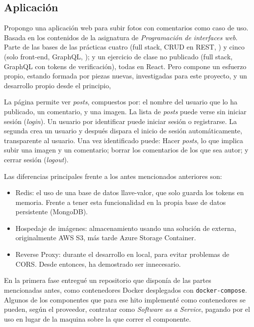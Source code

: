\documentclass[11pt]{article}
\begin{document}
\begin{flushleft}
\clearpage
\section{Aplicación}
Propongo una aplicación web para subir fotos con comentarios como caso de uso. Basada en los contenidos de la asignatura de \textit{Programación de interfaces web}. Parte de las bases de las prácticas cuatro (full stack, CRUD en REST, \cite{misgit1}) y cinco (solo front-end, GraphQL, \cite{misgit2}); y un ejercicio de clase no publicado (full stack, GraphQL con tokens de verificación), todas en React. Pero compone un esfuerzo propio, estando formada por piezas nuevas, investigadas para este proyecto, y un desarrollo propio desde el principio, 
\linebreak

La página permite ver \textit{posts}, compuestos por: el nombre del usuario que lo ha publicado, un comentario, y una imagen. La lista de \textit{posts} puede verse sin iniciar sesión (\textit{login}). Un usuario por identificar puede iniciar sesión o registrarse. La segunda crea un usuario y después dispara el inicio de sesión automáticamente, transparente al usuario. Una vez identificado puede: Hacer \textit{posts}, lo que implica subir una imagen y un comentario; borrar los comentarios de los que sea autor; y cerrar sesión (\textit{logout}). 
\linebreak 

Las diferencias principales frente a los antes mencionados anteriores son: 

	\begin{itemize}
		\itemsep0em 
		\item Redis: el uso de una base de datos llave-valor, que solo guarda los tokens en memoria. Frente a tener esta funcionalidad en la propia base de datos persistente (MongoDB).
		\item Hospedaje de imágenes: almacenamiento usando una solución de externa, originalmente AWS S3, más tarde Azure Storage Container.
		\item Reverse Proxy: durante el desarrollo en local, para evitar problemas de CORS. Desde entonces, ha demostrado ser innecesario.
	\end{itemize}

\smallskip

En la primera fase entregué un repositorio que disponía de las partes mencionadas antes, como contenedores Docker desplegados con \texttt{docker-compose}. Algunos de los componentes que para ese hito implementé como contenedores se pueden, según el proveedor, contratar como \textit{Software as a Service}, pagando por el uso en lugar de la maquina sobre la que correr el componente.  
\linebreak


\end{flushleft}
\end{document}
